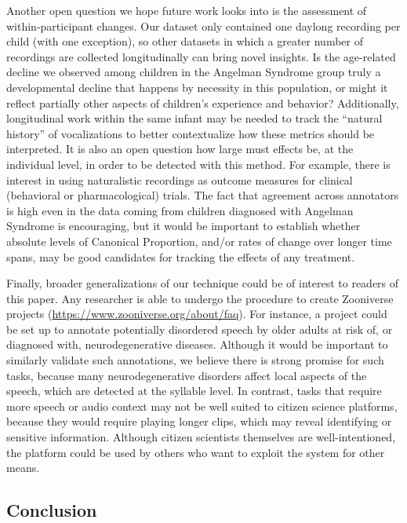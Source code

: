 \documentclass[english,,man,floatsintext]{apa6}
\begin{document}
Another open question we hope future work looks into is the assessment of within-participant changes. Our dataset only contained one daylong recording per child (with one exception), so other datasets in which a greater number of recordings are collected longitudinally can bring novel insights. Is the age-related decline we observed among children in the Angelman Syndrome group truly a developmental decline that happens by necessity in this population, or might it reflect partially other aspects of children's experience and behavior? Additionally, longitudinal work within the same infant may be needed to track the \enquote{natural history} of vocalizations to better contextualize how these metrics should be interpreted. It is also an open question how large must effects be, at the individual level, in order to be detected with this method. For example, there is interest in using naturalistic recordings as outcome measures for clinical (behavioral or pharmacological) trials. The fact that agreement across annotators is high even in the data coming from children diagnosed with Angelman Syndrome is encouraging, but it would be important to establish whether absolute levels of Canonical Proportion, and/or rates of change over longer time spans, may be good candidates for tracking the effects of any treatment.

Finally, broader generalizations of our technique could be of interest to readers of this paper. Any researcher is able to undergo the procedure to create Zooniverse projects (\url{https://www.zooniverse.org/about/faq}). For instance, a project could be set up to annotate potentially disordered speech by older adults at risk of, or diagnosed with, neurodegenerative diseases. Although it would be important to similarly validate such annotations, we believe there is strong promise for such tasks, because many neurodegenerative disorders affect local aspects of the speech, which are detected at the syllable level. In contrast, tasks that require more speech or audio context may not be well suited to citizen science platforms, because they would require playing longer clips, which may reveal identifying or sensitive information. Although citizen scientists themselves are well-intentioned, the platform could be used by others who want to exploit the system for other means.

\hypertarget{conclusion}{%
\subsection{Conclusion}\label{conclusion}}
\end{document}
